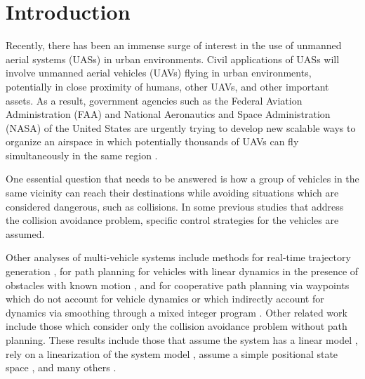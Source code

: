 \section{Introduction}
Recently, there has been an immense surge of interest in the use of unmanned aerial systems (UASs) in urban environments. 
Civil applications of UASs will involve unmanned aerial vehicles (UAVs) flying in urban environments, potentially in close proximity of humans, other UAVs, and other important assets. 
As a result, government agencies such as the Federal Aviation Administration (FAA) and National Aeronautics and Space Administration (NASA) of the United States are urgently trying to develop new scalable ways to organize an airspace in which potentially thousands of UAVs can fly simultaneously in the same region \cite{FAA13, Kopardekar16}.

One essential question that needs to be answered is how a group of vehicles in the same vicinity can reach their destinations while avoiding situations which are considered dangerous, such as collisions. In some previous studies that address the collision avoidance problem, specific control strategies for the vehicles are assumed.  

Other analyses of multi-vehicle systems include methods for real-time trajectory generation \cite{Feng-LiLian2002}, for path planning for vehicles with linear dynamics in the presence of obstacles with known motion \cite{Ahmadzadeh2009}, and for cooperative path planning via waypoints which do not account for vehicle dynamics \cite{Bellingham} or which indirectly account for dynamics via smoothing through a mixed integer program \cite{Mellinger2012a}. Other related work include those which consider only the collision avoidance problem without path planning. These results include those that assume the system has a linear model \cite{Beard2003, Schouwenaars2004, Stipanovic2007}, rely on a linearization of the system model \cite{Massink2001, Althoff2011}, assume a simple positional state space \cite{Lin2015}, and many others \cite{Lalish2008, Hoffmann2008, Chen2016}.

